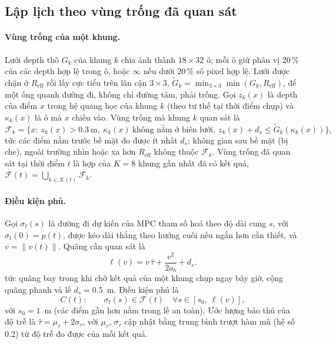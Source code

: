 \documentclass[11pt,a4paper]{article}
\theoremstyle{plain}
\theoremstyle{definition}
\theoremstyle{remark}
\newcommand{\tauh}{\hat{\tau}}
\newcommand{\Reff}{R_{\mathrm{eff}}}
\newcommand{\Fs}{\mathcal{F}}
\begin{document}
\subsection{Lập lịch theo vùng trống đã quan sát}\label{sec:scheduler}

\paragraph{Vùng trống của một khung.} Lưới depth thô $G_k$ của khung $k$ chia ảnh thành $18\times32$ ô; mỗi ô giữ phân vị 20\,\% của các depth hợp lệ trong ô, hoặc $\infty$ nếu dưới 20\,\% số pixel hợp lệ. Lưới được chặn ở $\Reff$ rồi lấy cực tiểu trên lân cận $3\times3$, $\tilde G_k = \min_{3\times3}\min(G_k,\Reff)$, để một ống quanh đường đi, không chỉ đường tâm, phải trống. Gọi $z_k(x)$ là depth của điểm $x$ trong hệ quang học của khung $k$ (theo tư thế tại thời điểm chụp) và $\kappa_k(x)$ là ô mà $x$ chiếu vào. Vùng trống mà khung $k$ quan sát là
\begin{equation}\label{eq:free}
\Fs_k = \big\{x:\ z_k(x) > 0.3~\text{m},\ \kappa_k(x)\ \text{không nằm ở biên lưới},\ z_k(x) + d_s \le \tilde G_k(\kappa_k(x))\big\},
\end{equation}
tức các điểm nằm trước bề mặt đo được ít nhất $d_s$; không gian sau bề mặt (bị che), ngoài trường nhìn hoặc xa hơn $\Reff$ không thuộc $\Fs_k$. Vùng trống đã quan sát tại thời điểm $t$ là hợp của $K = 8$ khung gần nhất đã có kết quả, $\Fs(t) = \bigcup_{k\in\mathcal K(t)}\Fs_k$.

\paragraph{Điều kiện phủ.} Gọi $\sigma_t(s)$ là đường đi dự kiến của MPC tham số hoá theo độ dài cung $s$, với $\sigma_t(0) = p(t)$, được kéo dài thẳng theo hướng cuối nếu ngắn hơn cần thiết, và $v = \|v(t)\|$. Quãng cần quan sát là
\begin{equation}\label{eq:need}
\ell(v) = v\,\tauh + \frac{v^2}{2a_b} + d_s,
\end{equation}
tức quãng bay trong khi chờ kết quả của một khung chụp ngay bây giờ, cộng quãng phanh và lề $d_s = 0.5$~m. Điều kiện phủ là
\begin{equation}\label{eq:cov}
C(t):\qquad \sigma_t(s) \in \Fs(t)\quad \forall s \in [s_0,\ \ell(v)],
\end{equation}
với $s_0 = 1$~m (các điểm gần hơn nằm trong lề an toàn). Ước lượng bảo thủ của độ trễ là $\tauh = \mu_\tau + 2\sigma_\tau$, với $\mu_\tau$, $\sigma_\tau$ cập nhật bằng trung bình trượt hàm mũ (hệ số 0.2) từ độ trễ đo được của mỗi kết quả.
\end{document}
